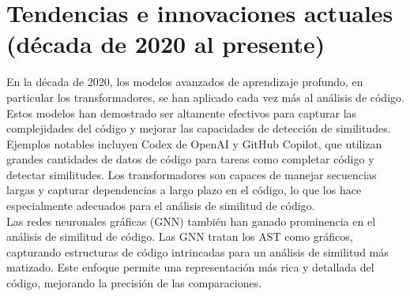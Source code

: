 \section*{\textbf{Tendencias e innovaciones actuales (década de 2020 al presente)}}
En la década de 2020, los modelos avanzados de aprendizaje profundo, en particular los transformadores, se han aplicado cada vez más al análisis de código. Estos modelos han demostrado ser altamente efectivos para capturar las complejidades del código y mejorar las capacidades de detección de similitudes. \\

Ejemplos notables incluyen Codex de OpenAI y GitHub Copilot, que utilizan grandes cantidades de datos de código para tareas como completar código y detectar similitudes. Los transformadores son capaces de manejar secuencias largas y capturar dependencias a largo plazo en el código, lo que los hace especialmente adecuados para el análisis de similitud de código. \\

Las redes neuronales gráficas (GNN) también han ganado prominencia en el análisis de similitud de código. Las GNN tratan los AST como gráficos, capturando estructuras de código intrincadas para un análisis de similitud más matizado. Este enfoque permite una representación más rica y detallada del código, mejorando la precisión de las comparaciones.
